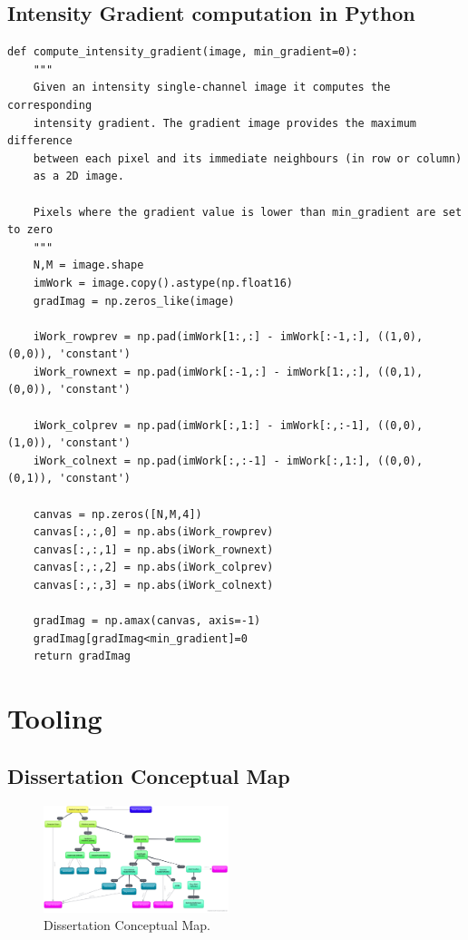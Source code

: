 \documentclass[
  twoside,
  11pt, a4paper,
  footinclude=true,
  headinclude=true,
  cleardoublepage=empty
]{scrbook}
\begin{document}
      \section{Intensity Gradient computation in Python} \label{appendix:intensity-grad}
        \begin{lstlisting}
def compute_intensity_gradient(image, min_gradient=0):
    """
    Given an intensity single-channel image it computes the corresponding
    intensity gradient. The gradient image provides the maximum difference
    between each pixel and its immediate neighbours (in row or column)
    as a 2D image.

    Pixels where the gradient value is lower than min_gradient are set to zero
    """
    N,M = image.shape
    imWork = image.copy().astype(np.float16)
    gradImag = np.zeros_like(image)

    iWork_rowprev = np.pad(imWork[1:,:] - imWork[:-1,:], ((1,0),(0,0)), 'constant')
    iWork_rownext = np.pad(imWork[:-1,:] - imWork[1:,:], ((0,1),(0,0)), 'constant')

    iWork_colprev = np.pad(imWork[:,1:] - imWork[:,:-1], ((0,0),(1,0)), 'constant')
    iWork_colnext = np.pad(imWork[:,:-1] - imWork[:,1:], ((0,0),(0,1)), 'constant')

    canvas = np.zeros([N,M,4])
    canvas[:,:,0] = np.abs(iWork_rowprev)
    canvas[:,:,1] = np.abs(iWork_rownext)
    canvas[:,:,2] = np.abs(iWork_colprev)
    canvas[:,:,3] = np.abs(iWork_colnext)

    gradImag = np.amax(canvas, axis=-1)
    gradImag[gradImag<min_gradient]=0
    return gradImag
        \end{lstlisting}

    \chapter{Tooling} \label{tooling}
      \section{Dissertation Conceptual Map}
        \begin{figure}[h]
          \centering
          \includegraphics[angle=90,width=0.48\textwidth]{"./img/mind-map"}
          \caption[Dissertation Conceptual Map]{Dissertation Conceptual Map.}
          \label{appendix:concepts}
        \end{figure}



  \endgroup
\end{document}
